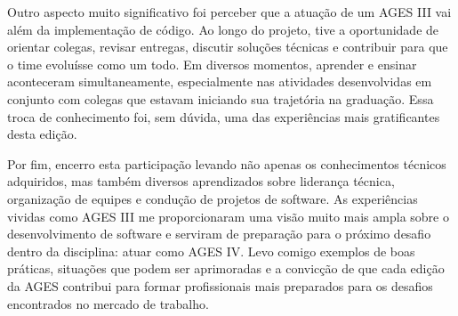 \indent Outro aspecto muito significativo foi perceber que a atuação de um AGES III vai além da implementação de código. Ao longo do projeto, tive a oportunidade de orientar colegas, revisar entregas, discutir soluções técnicas e contribuir para que o time evoluísse como um todo. Em diversos momentos, aprender e ensinar aconteceram simultaneamente, especialmente nas atividades desenvolvidas em conjunto com colegas que estavam iniciando sua trajetória na graduação. Essa troca de conhecimento foi, sem dúvida, uma das experiências mais gratificantes desta edição.\par

\indent Por fim, encerro esta participação levando não apenas os conhecimentos técnicos adquiridos, mas também diversos aprendizados sobre liderança técnica, organização de equipes e condução de projetos de software. As experiências vividas como AGES III me proporcionaram uma visão muito mais ampla sobre o desenvolvimento de software e serviram de preparação para o próximo desafio dentro da disciplina: atuar como AGES IV. Levo comigo exemplos de boas práticas, situações que podem ser aprimoradas e a convicção de que cada edição da AGES contribui para formar profissionais mais preparados para os desafios encontrados no mercado de trabalho.\par

